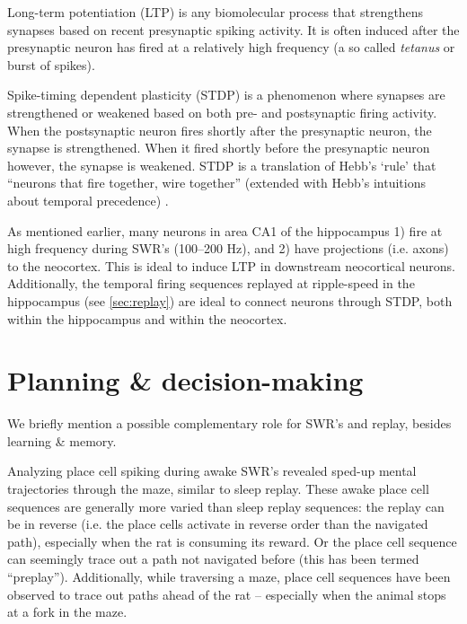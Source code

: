 
Long-term potentiation (LTP) is any biomolecular process that strengthens  synapses based on recent presynaptic spiking activity. It is often induced after the presynaptic neuron has fired at a relatively high frequency (a so called \emph{tetanus} or burst of spikes).

Spike-timing dependent plasticity (STDP) is a phenomenon where synapses are strengthened or weakened based on both pre- and postsynaptic firing activity. When the postsynaptic neuron fires shortly after the presynaptic neuron, the synapse is strengthened. When it fired shortly before the presynaptic neuron however, the synapse is weakened. STDP is a translation of Hebb's `rule' that ``neurons that fire together, wire together'' (extended with Hebb's intuitions about temporal precedence) \cite{Caporale2008}.

As mentioned earlier, many neurons in area CA1 of the hippocampus 1) fire at high frequency during SWR's (100--200 Hz), and 2) have projections (i.e. axons) to the neocortex. This is ideal to induce LTP in downstream neocortical neurons. Additionally, the temporal firing sequences replayed at ripple-speed in the hippocampus (see \cref{sec:replay}) are ideal to connect neurons through STDP, both within the hippocampus and within the neocortex.




\section{Planning \& decision-making}
\label{sec:planning}

We briefly mention a possible complementary role for SWR's and replay, besides learning \& memory.

Analyzing place cell spiking during awake SWR's revealed sped-up mental trajectories through the maze, similar to sleep replay. These awake place cell sequences are generally more varied than sleep replay sequences: the replay can be in reverse (i.e. the place cells activate in reverse order than the navigated path), especially when the rat is consuming its reward. Or the place cell sequence can seemingly trace out a path not navigated before (this has been termed ``preplay''). Additionally, while traversing a maze, place cell sequences have been observed to trace out paths ahead of the rat -- especially when the animal stops at a fork in the maze.

